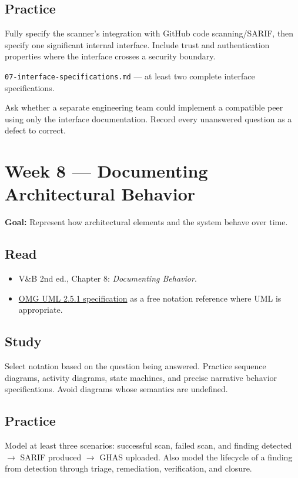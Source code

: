 \documentclass[10pt,letterpaper]{article}
\begin{document}
\subsection{Practice}
Fully specify the scanner's integration with GitHub code scanning/SARIF, then specify one significant internal interface. Include trust and authentication properties where the interface crosses a security boundary.

\begin{deliverablebox}
\texttt{07-interface-specifications.md} --- at least two complete interface specifications.
\end{deliverablebox}

\begin{masterybox}
Ask whether a separate engineering team could implement a compatible peer using only the interface documentation. Record every unanswered question as a defect to correct.
\end{masterybox}

\section{Week 8 --- Documenting Architectural Behavior}

\textbf{Goal:} Represent how architectural elements and the system behave over time.

\subsection{Read}
\begin{itemize}
  \item V\&B 2nd ed., Chapter 8: \emph{Documenting Behavior}.
  \item \href{https://www.omg.org/spec/UML/}{OMG UML 2.5.1 specification} as a free notation reference where UML is appropriate.
\end{itemize}

\subsection{Study}
Select notation based on the question being answered. Practice sequence diagrams, activity diagrams, state machines, and precise narrative behavior specifications. Avoid diagrams whose semantics are undefined.

\subsection{Practice}
Model at least three scenarios: successful scan, failed scan, and finding detected $\rightarrow$ SARIF produced $\rightarrow$ GHAS uploaded. Also model the lifecycle of a finding from detection through triage, remediation, verification, and closure.
\end{document}

